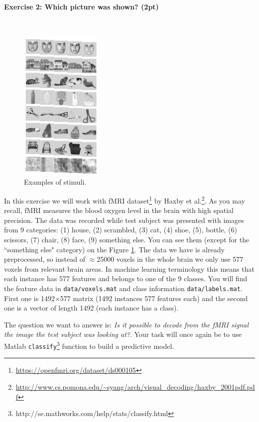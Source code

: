 \documentclass[a4paper,11pt]{article}
\newenvironment{exercise}[3]{\paragraph{Exercise #1: #2 (#3pt)}\ \\}{
\medskip}
\begin{document}
\pagebreak
%
%
\begin{exercise}{2}{Which picture was shown?}{2}
\begin{figure}
	\centering
	\vspace{-45pt}
	\includegraphics[width=0.35\textwidth]{stimuli.png}
	\caption{Examples of stimuli.}
	\label{fig:stimuli}
	\vspace{-20pt}
\end{figure}
In this exercise we will work with fMRI dataset\footnote{\url{https://openfmri.org/dataset/ds000105}} by Haxby et al.\footnote{\url{http://www.cs.pomona.edu/~syang/arch/visual_decoding/haxby_2001pdf.pdf}}. As you may recall, fMRI measures the blood oxygen level in the brain with high spatial precision. The data was recorded while test subject was presented with images from 9 categories: (1) house,  (2) scrambled, (3) cat, (4) shoe, (5), bottle, (6) scissors, (7) chair, (8) face, (9) something else. You can see them (except for the ``something else" category) on the Figure \ref{fig:stimuli}. The data we have is already preprocessed, so instead of $\approx$25000 voxels in the whole brain we only use 577 voxels from relevant brain areas. In machine learning terminology this means that each instance has 577 features and belongs to one of the 9 classes. You will find the feature data in \texttt{data/voxels.mat} and class information \texttt{data/labels.mat}. First one is 1492$\times$577 matrix (1492 instances 577 features each) and the second one is a vector of length 1492 (each instance has a class).

The question we want to answer is: \emph{Is it possible to decode from the fMRI signal the image the test subject was looking at?}. Your task will once again be to use Matlab \texttt{classify}\footnote{http://se.mathworks.com/help/stats/classify.html} function to build a predictive model.\\


\end{exercise}
\end{document}
